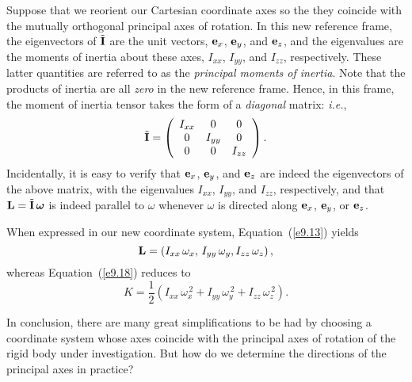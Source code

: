 Suppose that we reorient our Cartesian coordinate
axes so the they coincide with the mutually orthogonal principal axes of rotation. In this new reference frame, the eigenvectors of $\tilde{\bf I}$ are the unit vectors,
${\bf e}_x$, ${\bf e}_y$, and ${\bf e}_z$, and the eigenvalues
are the moments of inertia about these axes, $I_{xx}$, $I_{yy}$, and $I_{zz}$, respectively. These latter quantities are referred to as the
{\em principal moments of inertia}.
Note that the products of inertia are all {\em zero}\/ in the new
reference frame. Hence, in this frame, the moment
of inertia tensor takes the form of a  {\em diagonal}\/ matrix: {\em i.e.},
\begin{equation}
\tilde{\bf I} = 
\left(\begin{array}{ccc}
I_{xx}&0&0\\
0&I_{yy}&0\\
0&0&I_{zz}
\end{array}\right).
\end{equation}
Incidentally, it is easy to verify that ${\bf e}_x$, ${\bf e}_y$, and ${\bf e}_z$ are indeed
the eigenvectors of the above matrix, with the eigenvalues $I_{xx}$, $I_{yy}$, and $I_{zz}$, respectively, and that ${\bf L} = \tilde{\bf I}\,\mbox{\boldmath$\omega$}$ is indeed parallel to \mbox{\boldmath$\omega$} whenever \mbox{\boldmath$\omega$}
is directed along ${\bf e}_x$, ${\bf e}_y$, or ${\bf e}_z$.

When expressed in our new coordinate system, Equation~(\ref{e9.13})
yields
\begin{equation}
{\bf L} = \left(I_{xx}\,\omega_x,\,I_{yy}\,\omega_y,I_{zz}\,\omega_z\right),
\end{equation}
whereas Equation~(\ref{e9.18}) reduces to
\begin{equation}
K = \frac{1}{2}\left(I_{xx}\,\omega_x^{\,2} + I_{yy}\,\omega_y^{\,2}
+ I_{zz}\,\omega_z^{\,2}\right).
\end{equation}

In conclusion,  there are many great simplifications to be had by choosing a coordinate system whose axes coincide with the principal axes of rotation of the
rigid body under investigation. But how do we determine the directions of the
principal axes in practice?

